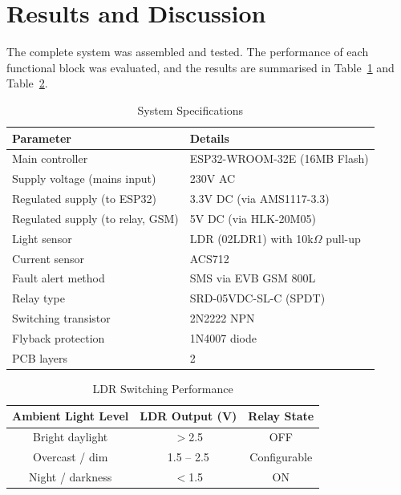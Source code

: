\section{Results and Discussion}

The complete system was assembled and tested. The performance of each functional block was evaluated, and the results are summarised in Table~\ref{tab:specs} and Table~\ref{tab:ldr}.

\begin{table}[H]
    \centering
    \caption{System Specifications}
    \label{tab:specs}
    \begin{tabular}{ll}
        \toprule
        \textbf{Parameter} & \textbf{Details} \\
        \midrule
        Main controller & ESP32-WROOM-32E (16MB Flash) \\
        Supply voltage (mains input) & 230V AC \\
        Regulated supply (to ESP32) & 3.3V DC (via AMS1117-3.3) \\
        Regulated supply (to relay, GSM) & 5V DC (via HLK-20M05) \\
        Light sensor & LDR (02LDR1) with 10k$\Omega$ pull-up \\
        Current sensor & ACS712 \\
        Fault alert method & SMS via EVB GSM 800L \\
        Relay type & SRD-05VDC-SL-C (SPDT) \\
        Switching transistor & 2N2222 NPN \\
        Flyback protection & 1N4007 diode \\
        PCB layers & 2 \\
        \bottomrule
    \end{tabular}
\end{table}

\begin{table}[H]
    \centering
    \caption{LDR Switching Performance}
    \label{tab:ldr}
    \begin{tabular}{ccc}
        \toprule
        \textbf{Ambient Light Level} & \textbf{LDR Output (V)} & \textbf{Relay State} \\
        \midrule
        Bright daylight & $>$2.5 & OFF \\
        Overcast / dim & 1.5 -- 2.5 & Configurable \\
        Night / darkness & $<$1.5 & ON \\
        \bottomrule
    \end{tabular}
\end{table}

